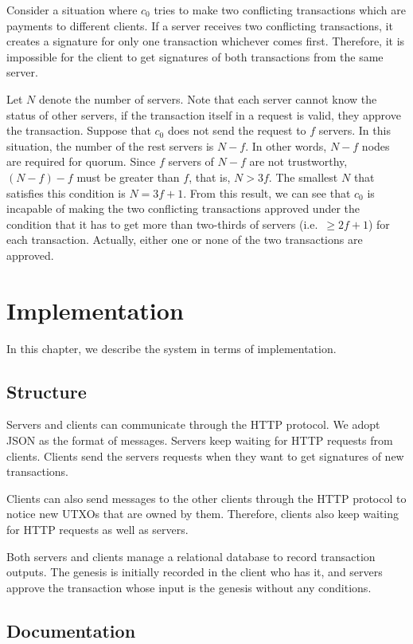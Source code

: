 \documentclass[a4paper, oneside]{discothesis}
\begin{document}
Consider a situation where $c_0$ tries to make two conflicting transactions
which are payments to different clients.
If a server receives two conflicting transactions,
it creates a signature for only one transaction whichever comes first.
Therefore, it is impossible for the client to get signatures of both transactions
from the same server.

Let $N$ denote the number of servers.
Note that each server cannot know the status of other servers,
if the transaction itself in a request is valid, they approve the transaction.
Suppose that $c_0$ does not send the request to $f$ servers.
In this situation, the number of the rest servers is $N-f$.
In other words, $N-f$ nodes are required for quorum.
Since $f$ servers of $N-f$ are not trustworthy, $(N-f)-f$ must be greater than $f$,
that is, $N > 3f$.
The smallest $N$ that satisfies this condition is $N=3f+1$.
From this result, we can see that $c_0$ is incapable of making the two conflicting transactions
approved under the condition that it has to get more than two-thirds of servers
(i.e.\ $\geq2f+1$) for each transaction.
Actually, either one or none of the two transactions are approved.

\chapter{Implementation}
In this chapter, we describe the system in terms of implementation.

\section{Structure}
Servers and clients can communicate through the HTTP protocol.
We adopt JSON as the format of messages.
Servers keep waiting for HTTP requests from clients.
Clients send the servers requests when they want to get signatures of new transactions.

Clients can also send messages to the other clients through the HTTP protocol
to notice new UTXOs that are owned by them.
Therefore, clients also keep waiting for HTTP requests as well as servers.

Both servers and clients manage a relational database to record transaction outputs.
The genesis is initially recorded in the client who has it,
and servers approve the transaction whose input is the genesis without any conditions.



\section{Documentation}
\end{document}
